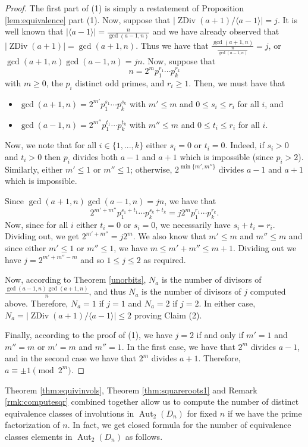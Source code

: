 \documentclass[12pt]{amsart}
\numberwithin{equation}{section}
\theoremstyle{definition}
\newcommand{\Aut}{\operatorname{Aut}}
\newcommand{\zdiv}[1]{{\operatorname{ZDiv}(#1)}}
\begin{document}
\begin{proof}
The first part of (1) is simply a restatement of Proposition \ref{lem:equivalence} part (1). Now, suppose that $|\zdiv{a+1}/\langle a-1\rangle|=j$. It is well known that $|\langle
  a-1\rangle|=\frac{n}{\gcd(a-1,n)}$ and we have already observed that
  $|\zdiv{a+1}|=\gcd(a+1,n)$. Thus we have that
  $\frac{\gcd(a+1,n)}{\frac{n}{\gcd(a-1,n)}}=j$, or
  $\gcd(a+1,n)\gcd(a-1,n)=jn$. Now, suppose that
$$n=2^mp_1^{r_1}\cdots p_k^{r_k}$$ 
with $m\geq 0$, the $p_i$ distinct odd primes, and $r_i\geq 1$. Then, we must have that 
\begin{itemize}
\item[]
$\gcd(a+1,n)=2^{m'}p_1^{s_1}\cdots p_k^{s_k}$ with $m'\leq m$ and $0\leq s_i\leq r_i$ for all $i$, and
\item[]
$\gcd(a-1,n)=2^{m''}p_1^{t_1}\cdots p_k^{t_k}$ with $m''\leq m$ and $0\leq t_i\leq r_i$ for all $i$.
\end{itemize}
Now, we note that for all $i\in\{1,...,k\}$ either $s_i=0$ or
$t_i=0$. Indeed, if $s_i>0$ and $t_i>0$ then $p_i$ divides both $a-1$
and $a+1$ which is impossible (since $p_i>2$). Similarly, either
$m'\leq1$ or $m''\leq1$; otherwise, $2^{\min\{m',m''\}}$ divides $a-1$
and $a+1$ which is impossible.

Since $\gcd(a+1,n)\gcd(a-1,n)=jn$, we have that
$$2^{m'+m''}p_1^{s_1+t_1}\cdots p_k^{s_k+t_k}=j2^mp_1^{r_1}\cdots p_k^{r_k}.$$
Now, since for all $i$ either $t_i=0$ or $s_i=0$, we necessarily have
$s_i+t_i=r_i$. Dividing out, we get $2^{m'+m''}=j2^m$. We also know
that $m'\leq m$ and $m''\leq m$ and since either $m'\leq 1$ or
$m''\leq 1$, we have $m\leq m'+m''\leq m+1$. Dividing out we have
$j=2^{m'+m''-m}$ and so $1\leq j\leq 2$ as required.

Now, according to Theorem \ref{unorbits}, $N_a$ is the number of divisors of $\frac{\gcd(a-1,n)\gcd(a+1,n)}{n}$, and thus $N_a$ is the number of divisors of $j$ computed above. Therefore, $N_a=1$ if $j=1$ and $N_a=2$ if $j=2$. In either case, $N_a = |\zdiv{a+1}/\langle a-1 \rangle| \le 2$ proving Claim (2).

Finally, according to the proof of (1), we have $j=2$ if and only if
$m'=1$ and $m''=m$ or $m'=m$ and $m''=1$. In the first case, we have
that $2^m$ divides $a-1$, and in the second case we have that $2^m$
divides $a+1$. Therefore, $a \equiv \pm 1 \pmod{2^m}$.
\end{proof}

Theorem \ref{thm:equivinvols}, Theorem \ref{thm:squareroots1} and Remark \ref{rmk:computesqr} combined together allow us to compute the number of distinct equivalence classes of involutions in $\Aut_2(D_n)$ for fixed $n$ if we have the prime factorization of $n$. In fact, we get closed formula for the number of equivalence classes elements in $\Aut_2(D_n)$ as follows.
\end{document}
